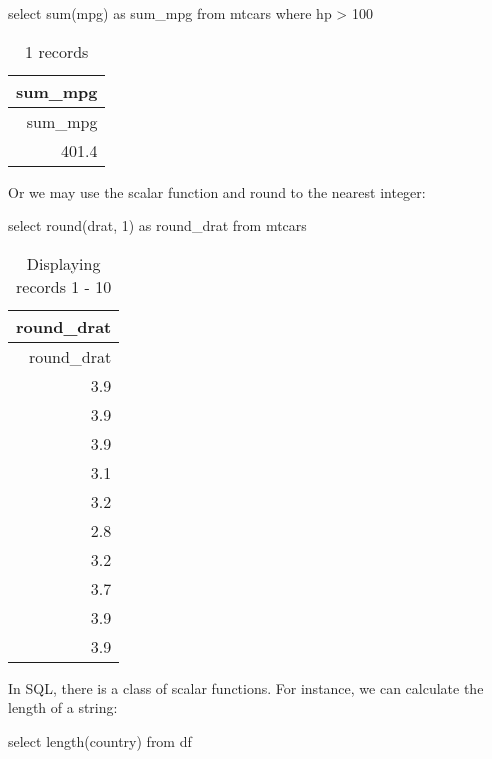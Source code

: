 \documentclass[
  letterpaper,
  DIV=11,
  numbers=noendperiod]{scrreprt}
\newenvironment{Shaded}{\begin{snugshade}}{\end{snugshade}}
\newcommand{\DecValTok}[1]{\textcolor[rgb]{0.68,0.00,0.00}{#1}}
\newcommand{\FunctionTok}[1]{\textcolor[rgb]{0.28,0.35,0.67}{#1}}
\newcommand{\KeywordTok}[1]{\textcolor[rgb]{0.00,0.23,0.31}{#1}}
\newcommand{\NormalTok}[1]{\textcolor[rgb]{0.00,0.23,0.31}{#1}}
\newcommand{\OperatorTok}[1]{\textcolor[rgb]{0.37,0.37,0.37}{#1}}
\begin{document}
\begin{Shaded}
\begin{Highlighting}[]
\KeywordTok{select} \FunctionTok{sum}\NormalTok{(mpg) }\KeywordTok{as}\NormalTok{ sum\_mpg }\KeywordTok{from}\NormalTok{ mtcars }\KeywordTok{where}\NormalTok{ hp }\OperatorTok{\textgreater{}} \DecValTok{100}
\end{Highlighting}
\end{Shaded}

\begin{longtable}[]{@{}r@{}}
\caption{1 records}\tabularnewline
\toprule()
sum\_mpg \\
\midrule()
\endfirsthead
\toprule()
sum\_mpg \\
\midrule()
\endhead
401.4 \\
\bottomrule()
\end{longtable}

Or we may use the scalar function and round to the nearest integer:

\begin{Shaded}
\begin{Highlighting}[]
\KeywordTok{select} \FunctionTok{round}\NormalTok{(drat, }\DecValTok{1}\NormalTok{) }\KeywordTok{as}\NormalTok{ round\_drat }\KeywordTok{from}\NormalTok{ mtcars}
\end{Highlighting}
\end{Shaded}

\begin{longtable}[]{@{}r@{}}
\caption{Displaying records 1 - 10}\tabularnewline
\toprule()
round\_drat \\
\midrule()
\endfirsthead
\toprule()
round\_drat \\
\midrule()
\endhead
3.9 \\
3.9 \\
3.9 \\
3.1 \\
3.2 \\
2.8 \\
3.2 \\
3.7 \\
3.9 \\
3.9 \\
\bottomrule()
\end{longtable}

In SQL, there is a class of scalar functions. For instance, we can
calculate the length of a string:

\begin{Shaded}
\begin{Highlighting}[]
\KeywordTok{select} \FunctionTok{length}\NormalTok{(country) }\KeywordTok{from}\NormalTok{ df}
\end{Highlighting}
\end{Shaded}
\end{document}
